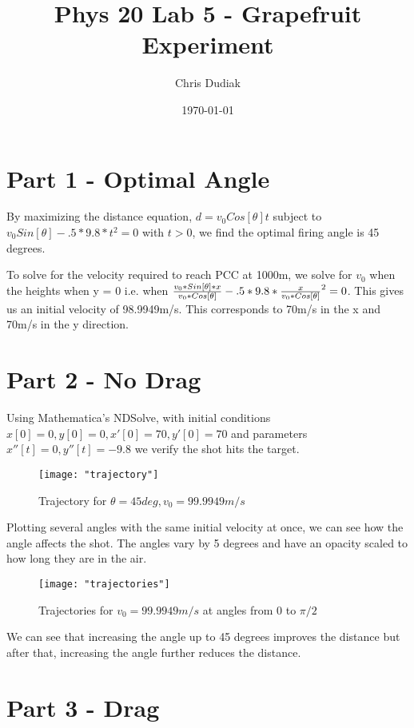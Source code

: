 \documentclass{article}
\begin{document}
\title{Phys 20 Lab 5 - Grapefruit Experiment}
\author{Chris Dudiak}
\date{\today}
\maketitle

\section{Part 1 - Optimal Angle}

By maximizing the distance equation, $d = v_0 Cos[\theta] t$ subject to $v_0 Sin[\theta] - .5 *9.8 * t^2 = 0$ with $t > 0$, we find the 
optimal firing angle is 45 degrees. 

To solve for the velocity required to reach PCC at 1000m, we solve for $v_0$ when the heights when y = 0 i.e. when 
${{v_0*Sin[\theta]*x} \over {v_0 * Cos[\theta]}} - .5 * 9.8 * {{x} \over {v_0 * Cos[\theta]}}^2 = 0$. This gives us an initial velocity of 98.9949m/s. This
corresponds to 70m/s in the x and 70m/s in the y direction.

\section{Part 2 - No Drag}
Using Mathematica's NDSolve, with initial conditions $x[0] = 0, y[0] = 0, x'[0] = 70, y'[0] = 70$ and parameters $x''[t] = 0, y''[t] = -9.8$
we verify the shot hits the target.

\begin{figure}[h!]
	\centering
	\texttt{[image: "trajectory"]}
	\caption{Trajectory for $\theta = 45deg, v_0 = 99.9949m/s$}
\end{figure} 
\FloatBarrier

Plotting several angles with the same initial velocity at once, we can see how the angle affects the shot. The angles vary by 5 degrees and 
have an opacity scaled to how long they are in the air.

\begin{figure}[h!]
	\centering
	\texttt{[image: "trajectories"]}
	\caption{Trajectories for  $v_0 = 99.9949m/s$ at angles from 0 to $\pi/2$}
\end{figure} 
\FloatBarrier

We can see that increasing the angle up to 45 degrees improves the distance but after that, increasing the angle further reduces the distance.

\section{Part 3 - Drag}
\end{document}
